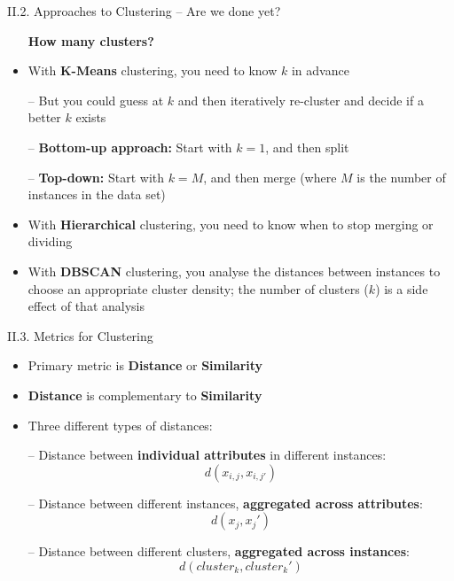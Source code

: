 \documentclass[handout]{beamer}
\newcommand{\strong}[1]{\textbf{\color{teal} #1}}
\newcommand{\stronger}[1]{\textbf{\color{purple} #1}}
\begin{document}
\begin{frame}{II.2. Approaches to Clustering -- Are we done yet?}
\begin{itemize}
\item[] \strong{How many clusters?}
\item With \stronger{K-Means} clustering, you need to know $k$ in advance
\item[--] But you could guess at $k$ and then iteratively re-cluster and decide if a better $k$ exists
\item[--] \strong{Bottom-up approach:} Start with $k=1$, and then split
\item[--] \strong{Top-down:} Start with $k=M$, and then merge (where $M$ is the number of instances in the data set)
\item With \stronger{Hierarchical} clustering, you need to know when to stop merging or dividing
\item With \stronger{DBSCAN} clustering, you analyse the distances between instances to choose an appropriate cluster density; the number of clusters ($k$) is a side effect of that analysis
\end{itemize}
\end{frame}
\begin{frame}{II.3. Metrics for Clustering}
\begin{itemize}
\item Primary metric is \strong{Distance} or \strong{Similarity}
\item \strong{Distance} is complementary to \strong{Similarity}
\item Three different types of distances:
\item[--] Distance between \strong{individual attributes} in different instances:
\[
	d( x_{i,j}, x_{i,j'} )
\]
\item[--] Distance between different instances, \strong{aggregated across attributes}:
\[
	d( x_j, x_j' )
\]
\item[--] Distance between different clusters, \strong{aggregated across instances}:
\[
	d( cluster_k, cluster_k' )
\]
\end{itemize}
\end{frame}
\end{document}
